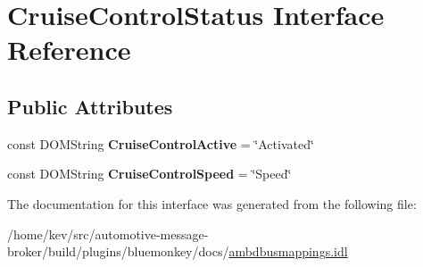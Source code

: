 \hypertarget{interfaceCruiseControlStatus}{\section{Cruise\+Control\+Status Interface Reference}
\label{interfaceCruiseControlStatus}
}
\subsection*{Public Attributes}
\begin{DoxyCompactItemize}
\item 
\hypertarget{interfaceCruiseControlStatus_a53b67edfb476d0fb49919d6f831ef7ac}{const D\+O\+M\+String {\bfseries Cruise\+Control\+Active} = \char`\"{}Activated\char`\"{}}\label{interfaceCruiseControlStatus_a53b67edfb476d0fb49919d6f831ef7ac}

\item 
\hypertarget{interfaceCruiseControlStatus_ae4bfdcaa9eaf5e7dace7dcc23e9513ee}{const D\+O\+M\+String {\bfseries Cruise\+Control\+Speed} = \char`\"{}Speed\char`\"{}}\label{interfaceCruiseControlStatus_ae4bfdcaa9eaf5e7dace7dcc23e9513ee}

\end{DoxyCompactItemize}


The documentation for this interface was generated from the following file\+:\begin{DoxyCompactItemize}
\item 
/home/kev/src/automotive-\/message-\/broker/build/plugins/bluemonkey/docs/\hyperlink{ambdbusmappings_8idl}{ambdbusmappings.\+idl}\end{DoxyCompactItemize}

